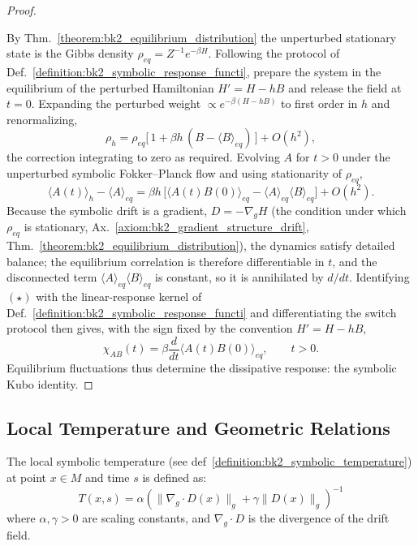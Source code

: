 \begin{proof}
\label{proof:bk2_symbolic_fluctuation_dissipation_relation}
\leavevmode

By Thm.~\ref{theorem:bk2_equilibrium_distribution} the unperturbed stationary state is the Gibbs density $\rho_{eq} = Z^{-1}e^{-\beta H}$. Following the protocol of Def.~\ref{definition:bk2_symbolic_response_functi}, prepare the system in the equilibrium of the perturbed Hamiltonian $H' = H - hB$ and release the field at $t=0$. Expanding the perturbed weight $\propto e^{-\beta(H-hB)}$ to first order in $h$ and renormalizing,
\[
\rho_h = \rho_{eq}\bigl[\,1 + \beta h\,(B - \langle B\rangle_{eq})\,\bigr] + O(h^2),
\]
the correction integrating to zero as required. Evolving $A$ for $t>0$ under the unperturbed symbolic Fokker--Planck flow and using stationarity of $\rho_{eq}$,
\[
\langle A(t)\rangle_h - \langle A\rangle_{eq}
   = \beta h\,\bigl[\langle A(t)B(0)\rangle_{eq} - \langle A\rangle_{eq}\langle B\rangle_{eq}\bigr] + O(h^2).
\tag{$\star$}
\]
Because the symbolic drift is a gradient, $D = -\nabla_g H$ (the condition under which $\rho_{eq}$ is stationary, Ax.~\ref{axiom:bk2_gradient_structure_drift}, Thm.~\ref{theorem:bk2_equilibrium_distribution}), the dynamics satisfy detailed balance; the equilibrium correlation is therefore differentiable in $t$, and the disconnected term $\langle A\rangle_{eq}\langle B\rangle_{eq}$ is constant, so it is annihilated by $d/dt$. Identifying $(\star)$ with the linear-response kernel of Def.~\ref{definition:bk2_symbolic_response_functi} and differentiating the switch protocol then gives, with the sign fixed by the convention $H'=H-hB$,
\[
\chi_{AB}(t) = \beta \frac{d}{dt}\langle A(t)B(0)\rangle_{eq}, \qquad t>0 .
\]
Equilibrium fluctuations thus determine the dissipative response: the symbolic Kubo identity.
\end{proof}

\subsection{Local Temperature and Geometric Relations}
\label{subsec:bk2_local_temperature_geometry}

\begin{definition} 
\label{definition:bk2_local_symbolic_temperature}
The local symbolic temperature (see def~\ref{definition:bk2_symbolic_temperature}) at point $x \in M$ and time $s$ is defined as:
\[
T(x,s) = \alpha \left( \|\nabla_g \cdot D(x)\|_g + \gamma \|D(x)\|_g \right)^{-1}
\]
where $\alpha, \gamma > 0$ are scaling constants, and $\nabla_g \cdot D$ is the divergence of the drift field.
\end{definition}

